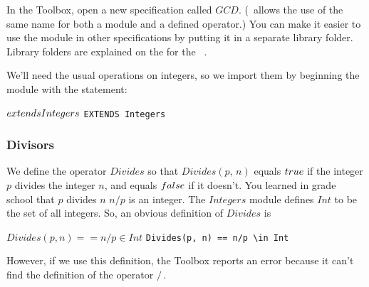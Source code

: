 \documentclass[fleqn,leqno]{article}
\begin{document}
In the Toolbox, open a new specification called $GCD$.  (\tlaplus\
allows the use of the same name for both a module and a defined
operator.)  
You can make it easier to use the module in other specifications
by putting it in a separate library folder.  Library folders
are explained on the
for the \tlaplus\
  .

We'll need the usual operations on integers, so we import
them by beginning the module with the statement:
\begin{display}
\begin{twocols}
$\EXTENDS Integers$
 \midcol
\verb|EXTENDS Integers|
\end{twocols}
\end{display}


%
\vspace{-\baselineskip}%
\subsubsection{Divisors}

We define the operator $Divides$ so that $Divides(p,\,n)$ equals
$\TRUE$ if the integer $p$ divides the integer $n$, and equals
$\FALSE$ if it doesn't.  You learned in grade school that $p$ divides
$n$ \popref{iff}{iff} $n/p$ is an integer.  The $Integers$ module
defines $Int$ to be the set of all integers.  So, an obvious
definition of $Divides$ is
\begin{display}
\begin{twocols}
$Divides(p, n)== n/p \in Int$
\midcol
\verb|Divides(p, n) == n/p \in Int|
\end{twocols}
\end{display}
However, if we use this definition, the Toolbox reports an error
because it can't find the definition of the operator $/$\,.
\end{document}
